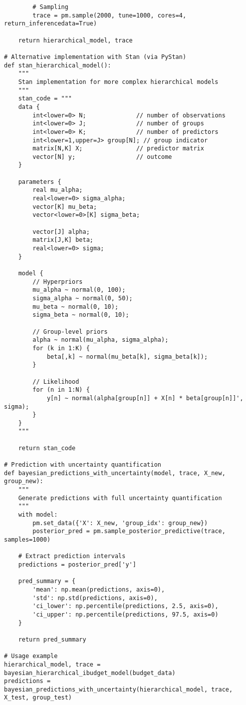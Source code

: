 \documentclass[12pt]{article}
\begin{document}
\begin{lstlisting}
        # Sampling
        trace = pm.sample(2000, tune=1000, cores=4, return_inferencedata=True)
    
    return hierarchical_model, trace

# Alternative implementation with Stan (via PyStan)
def stan_hierarchical_model():
    """
    Stan implementation for more complex hierarchical models
    """
    stan_code = """
    data {
        int<lower=0> N;              // number of observations
        int<lower=0> J;              // number of groups
        int<lower=0> K;              // number of predictors
        int<lower=1,upper=J> group[N]; // group indicator
        matrix[N,K] X;               // predictor matrix
        vector[N] y;                 // outcome
    }
    
    parameters {
        real mu_alpha;
        real<lower=0> sigma_alpha;
        vector[K] mu_beta;
        vector<lower=0>[K] sigma_beta;
        
        vector[J] alpha;
        matrix[J,K] beta;
        real<lower=0> sigma;
    }
    
    model {
        // Hyperpriors
        mu_alpha ~ normal(0, 100);
        sigma_alpha ~ normal(0, 50);
        mu_beta ~ normal(0, 10);
        sigma_beta ~ normal(0, 10);
        
        // Group-level priors
        alpha ~ normal(mu_alpha, sigma_alpha);
        for (k in 1:K) {
            beta[,k] ~ normal(mu_beta[k], sigma_beta[k]);
        }
        
        // Likelihood
        for (n in 1:N) {
            y[n] ~ normal(alpha[group[n]] + X[n] * beta[group[n]]', sigma);
        }
    }
    """
    
    return stan_code

# Prediction with uncertainty quantification
def bayesian_predictions_with_uncertainty(model, trace, X_new, group_new):
    """
    Generate predictions with full uncertainty quantification
    """
    with model:
        pm.set_data({'X': X_new, 'group_idx': group_new})
        posterior_pred = pm.sample_posterior_predictive(trace, samples=1000)
    
    # Extract prediction intervals
    predictions = posterior_pred['y']
    
    pred_summary = {
        'mean': np.mean(predictions, axis=0),
        'std': np.std(predictions, axis=0),
        'ci_lower': np.percentile(predictions, 2.5, axis=0),
        'ci_upper': np.percentile(predictions, 97.5, axis=0)
    }
    
    return pred_summary

# Usage example
hierarchical_model, trace = bayesian_hierarchical_ibudget_model(budget_data)
predictions = bayesian_predictions_with_uncertainty(hierarchical_model, trace, X_test, group_test)
\end{lstlisting}
\end{document}
